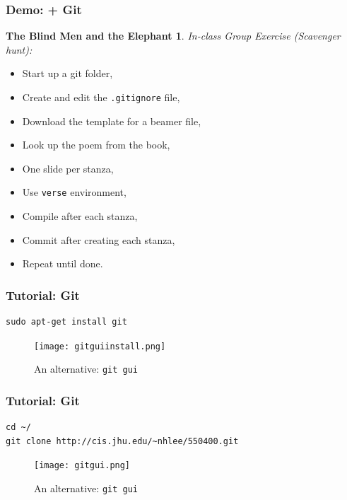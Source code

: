 \newtheorem{POEMbender}{The Blind Men and the Elephant}
\begin{frame}[fragile]
    \frametitle{Demo: \LaTeXs + Git}
    \begin{POEMbender}
        In-class Group Exercise (Scavenger hunt):
    \end{POEMbender}
        \begin{itemize}
            \item Start up a git folder,
            \item Create and edit the \texttt{.gitignore} file,
            \item Download the template for a beamer file,
            \item Look up the poem from the book,
            \item One slide per stanza,
            \item Use \texttt{verse} environment,
            \item Compile after each stanza,
            \item Commit after creating each stanza,
            \item Repeat until done.
        \end{itemize}
\end{frame}

\begin{frame}[fragile]
    \frametitle{Tutorial: Git}

\begin{lstlisting}
sudo apt-get install git
\end{lstlisting}

\begin{figure}[b]
    \caption{An alternative: \texttt{git gui}}
    \begin{center}
        \texttt{[image: gitguiinstall.png]}
    \end{center}
    \label{fig:gitgui}
\end{figure}
    
\end{frame}

\begin{frame}[fragile]
    \frametitle{Tutorial: Git}

\vspace{8pt}
\begin{lstlisting}
cd ~/
git clone http://cis.jhu.edu/~nhlee/550400.git
\end{lstlisting}

\begin{figure}[b]
    \caption{An alternative: \texttt{git gui}}
    \begin{center}
        \texttt{[image: gitgui.png]}
    \end{center}
    \label{fig:gitgui2}
\end{figure}
    
\end{frame}

